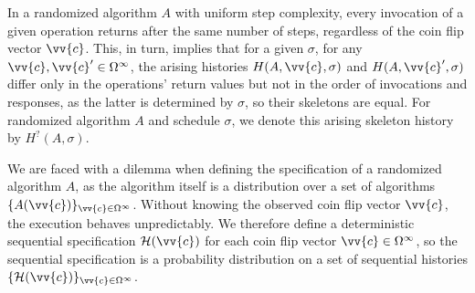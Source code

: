 
In a randomized algorithm $A$ with uniform step complexity, every invocation
of a given operation returns after the same number of steps,
regardless of the coin flip vector $\vv{c}$. This, in turn, implies that
for a given $\sigma$, for any $\vv{c}, \vv{c}' \in \Omega^{\infty}$, the
arising histories $H(A, \vv{c}, \sigma)$ and $H(A, \vv{c}', \sigma)$ differ only in the operations'
return values but not in the order of invocations and responses, as the latter is
determined by $\sigma$, so their skeletons are equal. For randomized algorithm $A$ and schedule $\sigma$,
we denote this arising skeleton history by $H^?(A, \sigma)$.

We are faced with a dilemma when defining the specification
of a randomized algorithm $A$, as the algorithm itself is a distribution over a
set of algorithms $\{A(\vv{c})\}_{\vv{c}\in \Omega^\infty}$. Without knowing
the observed coin flip vector $\vv{c}$, the execution behaves unpredictably. We therefore
define a deterministic sequential specification $\mathcal{H}(\vv{c})$ for each coin flip vector
$\vv{c} \in \Omega^\infty$, so the sequential specification is a
probability distribution on a set of sequential histories $\{\mathcal{H}(\vv{c})\}_{\vv{c}\in \Omega^\infty}$.


